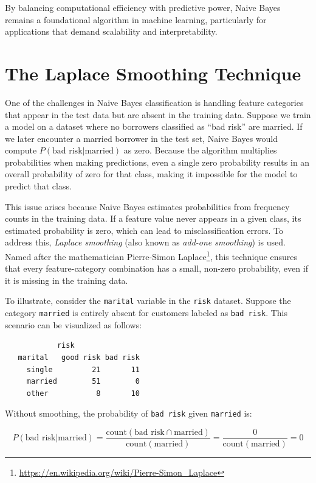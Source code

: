 \documentclass[
  11pt,
]{book}
\renewcommand{\href}[2]{#2\footnote{\url{#1}}}
\theoremstyle{definition}
\theoremstyle{definition}
\theoremstyle{definition}
\theoremstyle{definition}
\theoremstyle{remark}
\begin{document}
By balancing computational efficiency with predictive power, Naive Bayes remains a foundational algorithm in machine learning, particularly for applications that demand scalability and interpretability.

\section{The Laplace Smoothing Technique}\label{the-laplace-smoothing-technique}

One of the challenges in Naive Bayes classification is handling feature categories that appear in the test data but are absent in the training data. Suppose we train a model on a dataset where no borrowers classified as ``bad risk'' are married. If we later encounter a married borrower in the test set, Naive Bayes would compute \(P(\text{bad risk} | \text{married})\) as zero. Because the algorithm multiplies probabilities when making predictions, even a single zero probability results in an overall probability of zero for that class, making it impossible for the model to predict that class.

This issue arises because Naive Bayes estimates probabilities from frequency counts in the training data. If a feature value never appears in a given class, its estimated probability is zero, which can lead to misclassification errors. To address this, \emph{Laplace smoothing} (also known as \emph{add-one smoothing}) is used. Named after the mathematician \href{https://en.wikipedia.org/wiki/Pierre-Simon_Laplace}{Pierre-Simon Laplace}, this technique ensures that every feature-category combination has a small, non-zero probability, even if it is missing in the training data.

To illustrate, consider the \texttt{marital} variable in the \texttt{risk} dataset. Suppose the category \texttt{married} is entirely absent for customers labeled as \texttt{bad\ risk}. This scenario can be visualized as follows:

\begin{verbatim}
            risk
   marital   good risk bad risk
     single         21       11
     married        51        0
     other           8       10
\end{verbatim}

Without smoothing, the probability of \texttt{bad\ risk} given \texttt{married} is:

\[
P(\text{bad risk} | \text{married}) = \frac{\text{count}(\text{bad risk} \cap \text{married})}{\text{count}(\text{married})} = \frac{0}{\text{count}(\text{married})} = 0
\]
\end{document}
